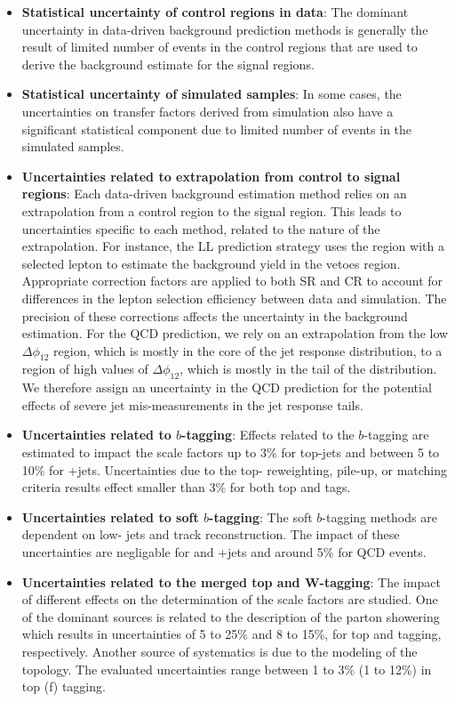 \begin{itemize}
	\item \textbf{Statistical uncertainty of control regions in data}: The dominant uncertainty in data-driven background prediction methods is generally the result of limited number of events in the control regions that are used to derive the background estimate for the signal regions.
	\item \textbf{Statistical uncertainty of simulated samples}: In some cases, the uncertainties on transfer factors derived from simulation also have a significant statistical component due to limited number of events in the simulated samples.
	\item \textbf{Uncertainties related to extrapolation from control to signal regions}: Each data-driven background estimation method relies on an extrapolation from a control region to the signal region. This leads to uncertainties specific to each method, related to the nature of the extrapolation. For instance, the LL prediction strategy uses the region with a selected lepton to estimate the background yield in the vetoes region. Appropriate correction factors are applied to both SR and CR to account for differences in the lepton selection efficiency between data and simulation. The precision of these corrections affects the uncertainty in the background estimation. For the QCD prediction, we rely on an extrapolation from the low $\Delta\phi_{12}$ region, which is mostly in the core of the jet response distribution, to a region of high values of $\Delta\phi_{12}$, which is mostly in the tail of the distribution. We therefore assign an uncertainty in the QCD prediction for the potential effects of severe jet mis-measurements in the jet response tails. 
	\item \textbf{Uncertainties related to $b$-tagging}: Effects related to the $b$-tagging are estimated to impact the scale factors up to 3\% for top-jets and between 5 to 10\% for \W+jets. Uncertainties due to the top-\pt{} reweighting, pile-up, or matching criteria results effect smaller than 3\% for both top and \W{} tags. 
	\item \textbf{Uncertainties related to soft $b$-tagging}: The soft $b$-tagging methods are dependent on low-\pt{} jets and track reconstruction. The impact of these uncertainties are negligable for \ttbar{} and \W+jets and around 5\% for QCD events.
	\item \textbf{Uncertainties related to the merged top and W-tagging}: The impact of different effects on the determination of the scale factors are studied. One of the dominant sources is related to the description of the parton showering which results in uncertainties of 5 to 25\% and 8 to 15\%, for top and \W{} tagging, respectively. Another source of systematics is due to the modeling of the \ttbar{} topology. The evaluated uncertainties range between 1 to 3\% (1 to 12\%) in top (f\W) tagging. 

\end{itemize}
